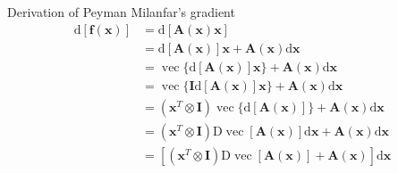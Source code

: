 \documentclass[oneside]{book}
\begin{document}
Derivation of Peyman Milanfar's gradient
\begin{align*}
\mathrm{d}[\mathbf{f}(\mathbf{x})] & =\mathrm{d}[\mathbf{A}(\mathbf{x}) \mathbf{x}] \\
& =\mathrm{d}[\mathbf{A}(\mathbf{x})] \mathbf{x}+\mathbf{A}(\mathbf{x}) \mathrm{d} \mathbf{x} \\
& =\operatorname{vec}\{\mathrm{d}[\mathbf{A}(\mathbf{x})] \mathbf{x}\}+\mathbf{A}(\mathbf{x}) \mathrm{d} \mathbf{x} \\
& =\operatorname{vec}\{\mathbf{I} \mathrm{d}[\mathbf{A}(\mathbf{x})] \mathbf{x}\}+\mathbf{A}(\mathbf{x}) \mathrm{d} \mathbf{x} \\
& =\left(\mathbf{x}^T \otimes \mathbf{I}\right) \operatorname{vec}\{\mathrm{d}[\mathbf{A}(\mathbf{x})]\}+\mathbf{A}(\mathbf{x}) \mathrm{d} \mathbf{x} \\
& =\left(\mathbf{x}^T \otimes \mathbf{I}\right) \mathrm{D} \operatorname{vec}[\mathbf{A}(\mathbf{x})] \mathrm{d} \mathbf{x}+\mathbf{A}(\mathbf{x}) \mathrm{d} \mathbf{x} \\
& =\left[\left(\mathbf{x}^T \otimes \mathbf{I}\right) \mathrm{D} \operatorname{vec}[\mathbf{A}(\mathbf{x})]+\mathbf{A}(\mathbf{x})\right] \mathrm{d} \mathbf{x}
\end{align*}
\end{document}
